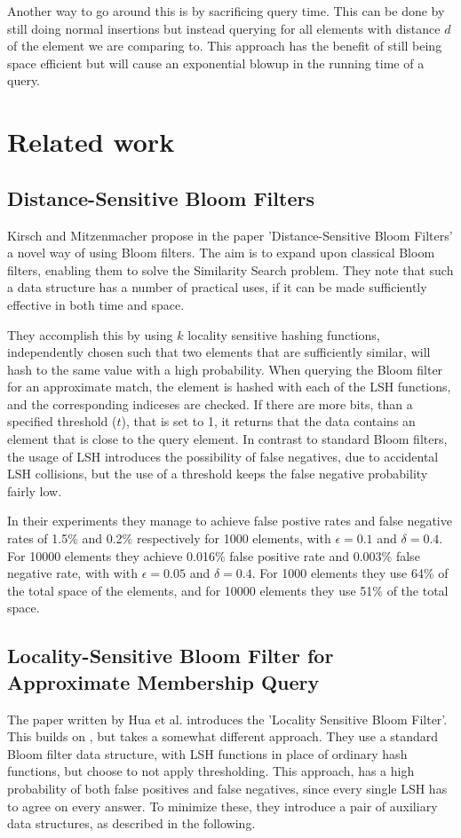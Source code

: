 \documentclass[a4paper,11pt]{article}
\begin{document}
Another way to go around this is by sacrificing query time. This can be done by still doing normal insertions but instead querying for all elements with distance $d$ of the element we are comparing to. This approach has the benefit of still being space efficient but will cause an exponential blowup in the running time of a query.

\section{Related work} %

\subsection{Distance-Sensitive Bloom Filters}
Kirsch and Mitzenmacher propose in the paper 'Distance-Sensitive Bloom Filters'\cite{paper:harvard} a novel way of using Bloom filters. The aim is to expand upon classical Bloom filters, enabling them to solve the Similarity Search problem. They note that such a data structure has a number of practical uses, if it can be made sufficiently effective in both time and space.

They accomplish this by using $k$ locality sensitive hashing functions, independently chosen such that two elements that are sufficiently similar, will hash to the same value with a high probability.
When querying the Bloom filter for an approximate match, the element is hashed with each of the LSH functions, and the corresponding indiceses are checked. If there are more bits, than a specified threshold ($t$), that is set to 1, it returns that the data contains an element that is close to the query element. In contrast to standard Bloom filters, the usage of LSH introduces the possibility of false negatives, due to accidental LSH collisions, but the use of a threshold keeps the false negative probability fairly low.

In their experiments they manage to achieve false postive rates and false negative rates of 1.5\% and 0.2\% respectively for 1000 elements, with $\epsilon = 0.1$ and $\delta = 0.4$. For 10000 elements they achieve 0.016\% false positive rate and 0.003\% false negative rate, with with $\epsilon = 0.05$ and $\delta = 0.4$. For 1000 elements they use 64\% of the total space of the elements, and for 10000 elements they use 51\% of the total space.

\subsection{Locality-Sensitive Bloom Filter for Approximate Membership Query}
The paper written by Hua et al.\cite{paper:hua} introduces the 'Locality Sensitive Bloom Filter'. This builds on \cite{paper:harvard}, but takes a somewhat different approach. They use a standard Bloom filter data structure, with LSH functions in place of ordinary hash functions, but choose to not apply thresholding. This approach, has a high probability of both false positives and false negatives, since every single LSH has to agree on every answer. To minimize these, they introduce a pair of auxiliary data structures, as described in the following.
\end{document}
